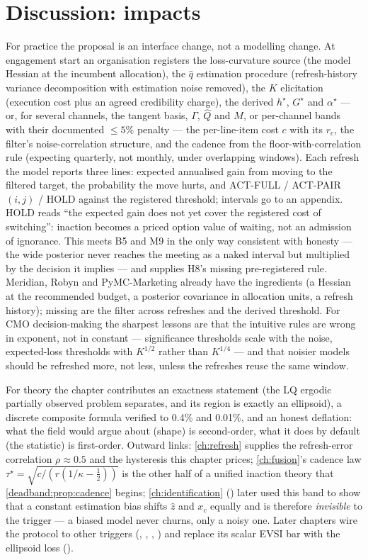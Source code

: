 \section{Discussion: impacts}

For practice the proposal is an interface change, not a modelling change. At engagement start an organisation registers the loss-curvature source (the model Hessian at the incumbent allocation), the $\hat q$ estimation procedure (refresh-history variance decomposition with estimation noise removed), the $K$ elicitation (execution cost plus an agreed credibility charge), the derived $h^\star$, $G^\star$ and $\alpha^\star$ --- or, for several channels, the tangent basis, $\Gamma$, $\hat Q$ and $M$, or per-channel bands with their documented $\le 5\%$ penalty --- the per-line-item cost $c$ with its $r_c$, the filter's noise-correlation structure, and the cadence from the floor-with-correlation rule (expecting quarterly, not monthly, under overlapping windows). Each refresh the model reports three lines: expected annualised gain from moving to the filtered target, the probability the move hurts, and ACT-FULL / ACT-PAIR$(i,j)$ / HOLD against the registered threshold; intervals go to an appendix. HOLD reads ``the expected gain does not yet cover the registered cost of switching'': inaction becomes a priced option value of waiting, not an admission of ignorance. This meets B5 and M9 in the only way consistent with honesty --- the wide posterior never reaches the meeting as a naked interval but multiplied by the decision it implies --- and supplies H8's missing pre-registered rule. Meridian, Robyn and PyMC-Marketing already have the ingredients (a Hessian at the recommended budget, a posterior covariance in allocation units, a refresh history); missing are the filter across refreshes and the derived threshold. For CMO decision-making the sharpest lessons are that the intuitive rules are wrong in exponent, not in constant --- significance thresholds scale with the noise, expected-loss thresholds with $K^{1/2}$ rather than $K^{1/4}$ --- and that noisier models should be refreshed more, not less, unless the refreshes reuse the same window.

For theory the chapter contributes an exactness statement (the LQ ergodic partially observed problem separates, and its region is exactly an ellipsoid), a discrete composite formula verified to 0.4\% and 0.01\%, and an honest deflation: what the field would argue about (shape) is second-order, what it does by default (the statistic) is first-order. Outward links: \cref{ch:refresh} supplies the refresh-error correlation $\rho \approx 0.5$ and the hysteresis this chapter prices; \cref{ch:fusion}'s cadence law $\tau^\star = \sqrt{c/(r(1/\kappa - \tfrac12))}$ is the other half of a unified inaction theory that \cref{deadband:prop:cadence} begins; \cref{ch:identification} () later used this band to show that a constant estimation bias shifts $\hat z$ and $x_c$ equally and is therefore \emph{invisible} to the trigger --- a biased model never churns, only a noisy one. Later chapters wire the protocol to other triggers (, , , ) and replace its scalar EVSI bar with the ellipsoid loss ().

